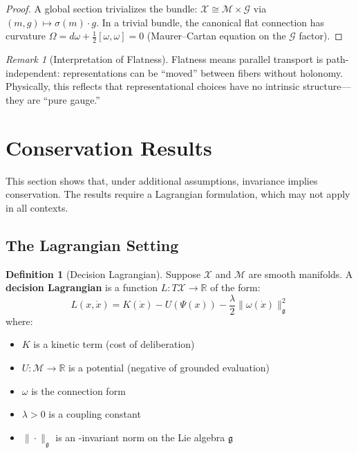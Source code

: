 \documentclass[12pt]{article}
\theoremstyle{definition}
\newtheorem{definition}[theorem]{Definition}
\theoremstyle{remark}
\newtheorem{remark}[theorem]{Remark}
\newcommand{\calX}{\mathcal{X}}
\newcommand{\calM}{\mathcal{M}}
\newcommand{\calG}{\mathcal{G}}
\newcommand{\fg}{\mathfrak{g}}
\begin{document}
\begin{proof}
A global section trivializes the bundle: $\calX \cong \calM \times \calG$ via $(m, g) \mapsto \sigma(m) \cdot g$. In a trivial
bundle, the canonical flat connection has curvature $\Omega = d\omega + \frac{1}{2}[\omega, \omega] = 0$ (Maurer--Cartan
equation on the $\calG$ factor).
\end{proof}

\begin{remark}[Interpretation of Flatness]\label{rem:flatness}
Flatness means parallel transport is path-independent:
representations can be ``moved'' between fibers without holonomy. Physically, this reflects that
representational choices have no intrinsic structure---they are ``pure gauge.''
\end{remark}

\section{Conservation Results}

This section shows that, under additional assumptions, invariance implies conservation. The
results require a Lagrangian formulation, which may not apply in all contexts.

\subsection{The Lagrangian Setting}

\begin{definition}[Decision Lagrangian]\label{def:lagrangian}
Suppose $\calX$ and $\calM$ are smooth manifolds. A \textbf{decision
Lagrangian} is a function $L : T\calX \to \mathbb{R}$ of the form:
\begin{equation}\label{eq:lagrangian}
    L(x, \dot{x}) = K(\dot{x}) - U(\Psi(x)) - \frac{\lambda}{2}\|\omega(\dot{x})\|^2_\fg
\end{equation}
where:
\begin{itemize}
    \item $K$ is a kinetic term (cost of deliberation)
    \item $U : \calM \to \mathbb{R}$ is a potential (negative of grounded evaluation)
    \item $\omega$ is the connection form
    \item $\lambda > 0$ is a coupling constant
    \item $\|\cdot\|_\fg$ is an -invariant norm on the Lie algebra $\fg$
\end{itemize}
\end{definition}
\end{document}
